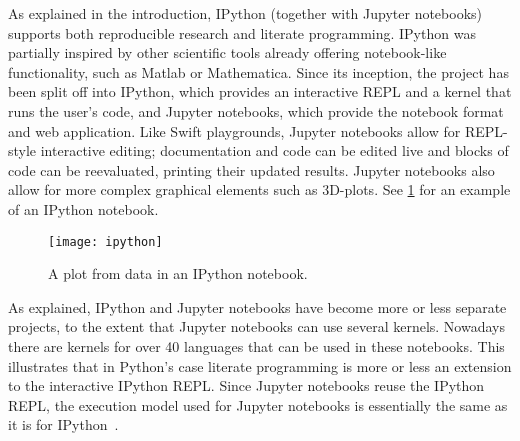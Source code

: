 As explained in the introduction, IPython (together with Jupyter notebooks)
supports both reproducible research and literate programming. IPython was
partially inspired by other scientific tools already offering notebook-like
functionality, such as Matlab or Mathematica. Since its inception, the project
has been split off into IPython, which provides an interactive REPL and a
kernel that runs the user's code, and Jupyter notebooks, which provide the
notebook format and web application. Like Swift playgrounds, Jupyter notebooks
allow for REPL-style interactive editing; documentation and code can be edited
live and blocks of code can be reevaluated, printing their updated results.
Jupyter notebooks also allow for more complex graphical elements such as
3D-plots. See \cref{fig:a-ipython} for an example of an IPython notebook.

\begin{figure}[htb]
  \centering
  \texttt{[image: ipython]}
  \caption{A plot from data in an IPython notebook.}
  \label{fig:a-ipython}
\end{figure}

As explained, IPython and Jupyter notebooks have become more or less separate
projects, to the extent that Jupyter notebooks can use several kernels.
Nowadays there are kernels for over 40 languages that can be used in these
notebooks. This illustrates that in Python's case literate programming is more
or less an extension to the interactive IPython REPL. Since Jupyter notebooks
reuse the IPython REPL, the execution model used for Jupyter notebooks is
essentially the same as it is for IPython~\cite{ipython-execution}.

